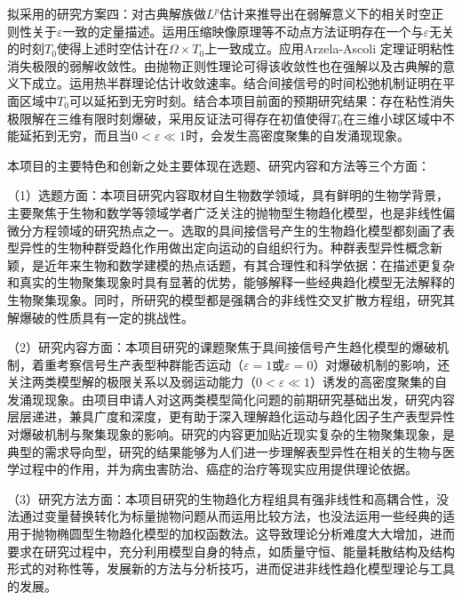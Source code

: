 \documentclass[12pt]{article}
\begin{document}
拟采用的研究方案四：对古典解族做$L^p$估计来推导出在弱解意义下的相关时空正则性关于$\varepsilon$一致的定量描述。运用压缩映像原理等不动点方法证明存在一个与$\varepsilon$无关的时刻$T_0$使得上述时空估计在$\Omega\times T_0$上一致成立。应用Arzela-Ascoli 定理证明粘性消失极限的弱解收敛性。由抛物正则性理论可得该收敛性也在强解以及古典解的意义下成立。运用热半群理论估计收敛速率。结合间接信号的时间松弛机制证明在平面区域中$T_0$可以延拓到无穷时刻。结合本项目前面的预期研究结果：存在粘性消失极限解在三维有限时刻爆破，采用反证法可得存在初值使得$T_0$在三维小球区域中不能延拓到无穷，而且当$0<\varepsilon\ll1$时，会发生高密度聚集的自发涌现现象。




本项目的主要特色和创新之处主要体现在选题、研究内容和方法等三个方面：

（1）选题方面：本项目研究内容取材自生物数学领域，具有鲜明的生物学背景，主要聚焦于生物和数学等领域学者广泛关注的抛物型生物趋化模型，也是非线性偏微分方程领域的研究热点之一。选取的具间接信号产生的生物趋化模型都刻画了表型异性的生物种群受趋化作用做出定向运动的自组织行为。种群表型异性概念新颖，是近年来生物和数学建模的热点话题，有其合理性和科学依据：在描述更复杂和真实的生物聚集现象时具有显著的优势，能够解释一些经典趋化模型无法解释的生物聚集现象。同时，所研究的模型都是强耦合的非线性交叉扩散方程组，研究其解爆破的性质具有一定的挑战性。

（2）研究内容方面：本项目研究的课题聚焦于具间接信号产生趋化模型的爆破机制，着重考察信号生产表型种群能否运动（$\varepsilon = 1$或$\varepsilon=0$）对爆破机制的影响，还关注两类模型解的极限关系以及弱运动能力（$0<\varepsilon\ll 1$）诱发的高密度聚集的自发涌现现象。由项目申请人对这两类模型简化问题的前期研究基础出发，研究内容层层递进，兼具广度和深度，更有助于深入理解趋化运动与趋化因子生产表型异性对爆破机制与聚集现象的影响。研究的内容更加贴近现实复杂的生物聚集现象，是典型的需求导向型，研究的结果能够为人们进一步理解表型异性在相关的生物与医学过程中的作用，并为病虫害防治、癌症的治疗等现实应用提供理论依据。

（3）研究方法方面：本项目研究的生物趋化方程组具有强非线性和高耦合性，没法通过变量替换转化为标量抛物问题从而运用比较方法，也没法运用一些经典的适用于抛物椭圆型生物趋化模型的加权函数法。这导致理论分析难度大大增加，进而要求在研究过程中，充分利用模型自身的特点，如质量守恒、能量耗散结构及结构形式的对称性等，发展新的方法与分析技巧，进而促进非线性趋化模型理论与工具的发展。

\end{document}
